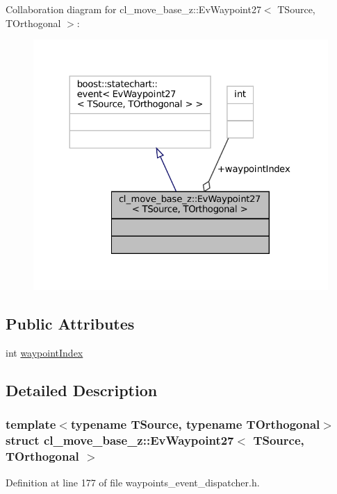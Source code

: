 Collaboration diagram for cl\+\_\+move\+\_\+base\+\_\+z\+:\+:Ev\+Waypoint27$<$ T\+Source, T\+Orthogonal $>$\+:
\nopagebreak
\begin{figure}[H]
\begin{center}
\leavevmode
\includegraphics[width=324pt]{structcl__move__base__z_1_1EvWaypoint27__coll__graph}
\end{center}
\end{figure}
\subsection*{Public Attributes}
\begin{DoxyCompactItemize}
\item 
int \hyperlink{structcl__move__base__z_1_1EvWaypoint27_a767a45932a723b597f00c9fd13cd1cc3}{waypoint\+Index}
\end{DoxyCompactItemize}


\subsection{Detailed Description}
\subsubsection*{template$<$typename T\+Source, typename T\+Orthogonal$>$\newline
struct cl\+\_\+move\+\_\+base\+\_\+z\+::\+Ev\+Waypoint27$<$ T\+Source, T\+Orthogonal $>$}



Definition at line 177 of file waypoints\+\_\+event\+\_\+dispatcher.\+h.



